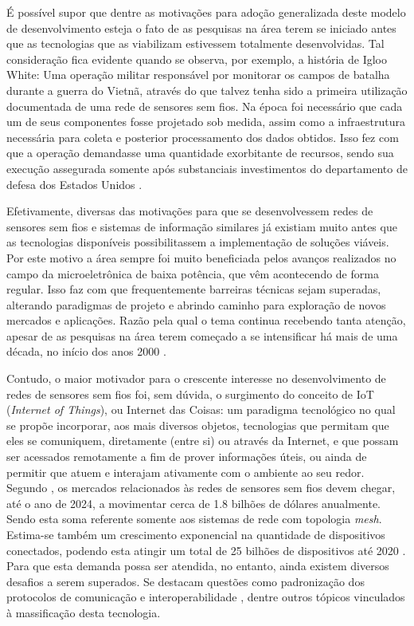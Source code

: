 \documentclass[
	12pt,				%
	openright,			%
	oneside,
	a4paper,			%
	english,			%
	french,				%
	spanish,			%
	brazil				%
	]{abntex2}
\begin{document}
É possível supor que dentre as motivações para adoção generalizada deste modelo de desenvolvimento esteja o fato de as pesquisas na área terem se iniciado antes que as tecnologias que as viabilizam estivessem totalmente desenvolvidas. Tal consideração fica evidente quando se observa, por exemplo, a história de Igloo White: Uma operação militar responsável por monitorar os campos de batalha durante a guerra do Vietnã, através do que talvez tenha sido a primeira utilização documentada de uma rede de sensores sem fios. Na época foi necessário que cada um de seus componentes fosse projetado sob medida, assim como a infraestrutura necessária para coleta e posterior processamento dos dados obtidos. Isso fez com que a operação demandasse uma quantidade exorbitante de recursos, sendo sua execução assegurada somente após substanciais investimentos do departamento de defesa dos Estados Unidos \cite{Warneke2001}.

Efetivamente, diversas das motivações para que se desenvolvessem redes de sensores sem fios e sistemas de informação similares já existiam muito antes que as tecnologias disponíveis possibilitassem a implementação de soluções viáveis. Por este motivo a área sempre foi muito beneficiada pelos avanços realizados no campo da microeletrônica de baixa potência, que vêm acontecendo de forma regular. Isso faz com que frequentemente barreiras técnicas sejam superadas, alterando paradigmas de projeto e abrindo caminho para exploração de novos mercados e aplicações. Razão pela qual o tema continua recebendo tanta atenção, apesar de as pesquisas na área terem começado a se intensificar há mais de uma década, no início dos anos 2000 \cite{Kahn2000, Pottie2000, Heinzelman2000}.

Contudo, o maior motivador para o crescente interesse no desenvolvimento de redes de sensores sem fios foi, sem dúvida, o surgimento do conceito de IoT (\textit{Internet of Things}), ou Internet das Coisas: um paradigma tecnológico no qual se propõe incorporar, aos mais diversos objetos, tecnologias que permitam que eles se comuniquem, diretamente (entre si) ou através da Internet, e que possam ser acessados remotamente a fim de prover informações úteis, ou ainda de permitir que atuem e interajam ativamente com o ambiente ao seu redor. Segundo \cite{Harrop2014}, os mercados relacionados às redes de sensores sem fios devem chegar, até o ano de 2024, a movimentar cerca de 1.8 bilhões de dólares anualmente. Sendo esta soma referente somente aos sistemas de rede com topologia \textit{mesh}. Estima-se também um crescimento exponencial na quantidade de dispositivos conectados, podendo esta atingir um total de 25 bilhões de dispositivos até 2020 \cite{Want2015}. Para que esta demanda possa ser atendida, no entanto, ainda existem diversos desafios a serem superados. Se destacam questões como padronização dos protocolos de comunicação e interoperabilidade \cite{Rawat2014, IEC2014}, dentre outros tópicos vinculados à massificação desta tecnologia. 
\end{document}

